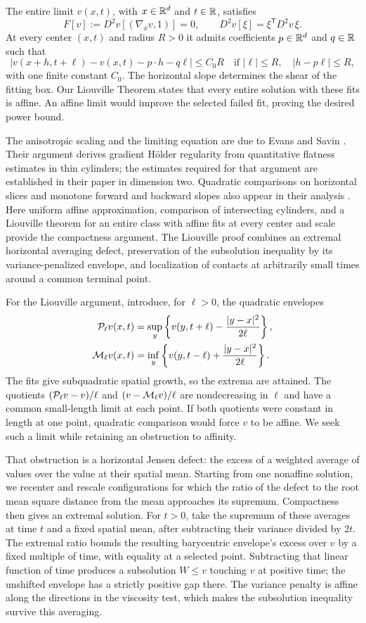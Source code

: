 The entire limit $v(x,t)$, with $x\in\mathbb{R}^d$ and $t\in\mathbb{R}$, satisfies
\[
 F[v]:=D^2v[(\nabla_xv,1)]=0,
 \qquad D^2v[\xi]=\xi^{\mathsf T}D^2v\,\xi.
\]
At every center $(x,t)$ and radius $R>0$ it admits coefficients
$p\in\mathbb{R}^d$ and $q\in\mathbb{R}$ such that
\[
 |v(x+h,t+\ell)-v(x,t)-p\cdot h-q\ell|\le C_0R
 \quad\text{if } |\ell|\le R,\quad |h-p\ell|\le R,
\]
with one finite constant $C_0$. The horizontal slope determines the
shear of the fitting box. Our Liouville Theorem states that every entire
solution with these fits is affine. An affine limit would improve the
selected failed fit, proving the desired power bound.

The anisotropic scaling and the limiting equation are due to Evans and
Savin \cite[Sections~2.3--2.4]{EvansSavin2008}. Their argument derives
gradient H\"older regularity from quantitative flatness estimates in thin
cylinders; the estimates required for that argument are established in
their paper in dimension two. Quadratic comparisons on horizontal slices
and monotone forward and backward slopes also appear in their analysis
\cite[Section~3]{EvansSavin2008}. Here uniform affine approximation,
comparison of intersecting cylinders, and a Liouville theorem for an
entire class with affine fits at every center and scale provide the
compactness argument. The Liouville proof combines an extremal
horizontal averaging defect, preservation of the subsolution inequality
by its variance-penalized envelope, and localization of contacts at
arbitrarily small times around a common terminal point.

For the Liouville argument, introduce, for $\ell>0$, the quadratic envelopes
\begin{align*}
 \mathcal{P}_\ell v(x,t)
   &=\sup_y\left\{v(y,t+\ell)-\frac{|y-x|^2}{2\ell}\right\},
 \\
 \mathcal{M}_\ell v(x,t)
   &=\inf_y\left\{v(y,t-\ell)+\frac{|y-x|^2}{2\ell}\right\}.
\end{align*}
The fits give subquadratic spatial growth, so the extrema are attained.
The quotients $(\mathcal{P}_\ell v-v)/\ell$ and
$(v-\mathcal{M}_\ell v)/\ell$ are nondecreasing in $\ell$ and have a common
small-length limit at each point. If both quotients were constant in
length at one point, quadratic comparison would force $v$ to be affine.
We seek such a limit while retaining an obstruction to affinity.

That obstruction is a horizontal Jensen defect: the excess of a weighted
average of values over the value at their spatial mean. Starting from one
nonaffine solution, we recenter and rescale configurations for which the
ratio of the defect to the root mean square distance from the mean
approaches its supremum.
Compactness then gives an extremal solution. For $t>0$, take the supremum
of these averages at time $t$ and a fixed spatial mean, after subtracting
their variance divided by $2t$. The extremal ratio bounds the resulting
barycentric envelope's excess over $v$ by a fixed multiple of time, with
equality at a selected point. Subtracting that linear function of time produces a subsolution
$W\le v$ touching $v$ at positive time; the unshifted envelope has a
strictly positive gap there. The variance penalty is affine along the
directions in the viscosity test, which makes the subsolution inequality
survive this averaging.

